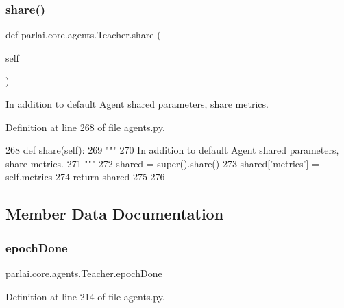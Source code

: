 \subsubsection{\texorpdfstring{share()}{share()}}
{\footnotesize\ttfamily def parlai.\+core.\+agents.\+Teacher.\+share (\begin{DoxyParamCaption}\item[{}]{self }\end{DoxyParamCaption})}

\begin{DoxyVerb}In addition to default Agent shared parameters, share metrics.
\end{DoxyVerb}
 

Definition at line 268 of file agents.\+py.


\begin{DoxyCode}
268     \textcolor{keyword}{def }share(self):
269         \textcolor{stringliteral}{"""}
270 \textcolor{stringliteral}{        In addition to default Agent shared parameters, share metrics.}
271 \textcolor{stringliteral}{        """}
272         shared = super().share()
273         shared[\textcolor{stringliteral}{'metrics'}] = self.metrics
274         \textcolor{keywordflow}{return} shared
275 
276 
\end{DoxyCode}


\subsection{Member Data Documentation}
\mbox{\label{classparlai_1_1core_1_1agents_1_1Teacher_a2a21915f2270b76ba0e99137d506af89}} 
\subsubsection{\texorpdfstring{epoch\+Done}{epochDone}}
{\footnotesize\ttfamily parlai.\+core.\+agents.\+Teacher.\+epoch\+Done}



Definition at line 214 of file agents.\+py.

\mbox{\label{classparlai_1_1core_1_1agents_1_1Teacher_a8385159acf54471fee8887ba2a83b53c}} 
